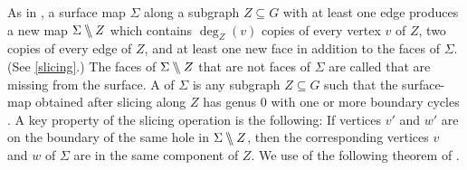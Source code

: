 
As in \cite{EricksonNotes},  a surface map $\Sigma$ along a subgraph $Z \subseteq G$ with at least one edge produces a new map $\Sigma \bbslash Z$ which contains $\deg_{Z}(v)$ copies of every vertex $v$ of $Z$, two copies of every edge of $Z$, and at least one new face in addition to the faces of $\Sigma$.  (See \cref{slicing}.)
The faces of $\Sigma \bbslash Z$ that are not faces of $\Sigma$ are called  that are missing from the surface. A  of $\Sigma$ is any subgraph $Z \subseteq G$ such that the surface-map obtained after slicing along $Z$ has genus $0$ with one or more boundary cycles \cite{EricksonNotes}.  A key property of the slicing operation is the following:  If vertices $v'$ and $w'$ are on the boundary of the same hole in $\Sigma\bbslash Z$, then the corresponding vertices $v$ and $w$ of $\Sigma$ are in the same component of $Z$. We use of the following theorem of \citet{10.5555/644108.644208}.


